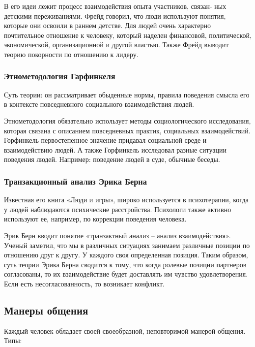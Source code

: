\documentclass{article}
\begin{document}
В его идеи лежит процесс взаимодействия опыта участников, связан-
ных детскими переживаниями. Фрейд говорил, что люди используют понятия, которые они освоили в раннем детстве. Для людей очень характерно почтительное отношение к человеку, который наделен финансовой, политической, экономической, организационной и другой властью. Также Фрейд выводит теорию покорности по отношению к лидеру.

\subsubsection{Этнометодология Гарфинкеля}

Суть теории: он рассматривает обыденные нормы, правила поведения смысла его в контексте повседневного социального взаимодействия людей.

Этнометодология обязательно использует методы социологического исследования, которая связана с описанием повседневных практик, социальных взаимодействий. Горфинкель первостепенное значение придавал социальной среде и взаимодействию людей. А также Горфинкель исследовал разные ситуации поведения людей. Например: поведение людей в суде, обычные беседы.

\subsubsection{Транзакционный анализ Эрика Берна}

Известная его книга «Люди и игры», широко используется в психотерапии, когда у людей наблюдаются психические расстройства. Психологи также активно используют ее, например, по коррекции поведения человека.

Эрик Берн вводит понятие «транзактный анализ – анализ взаимодействия». Ученый заметил, что мы в различных ситуациях занимаем различные позиции по отношению друг к другу. У каждого своя определенная позиция. Таким образом, суть теории Эрика Берна сводится к тому, что когда ролевые позиции партнеров согласованы, то их взаимодействие будет доставлять им чувство удовлетворения. Если есть несогласованность, то возникает конфликт.

\subsection{Манеры общения}

Каждый человек обладает своей своеобразной, неповторимой манерой общения. Типы:
\end{document}

